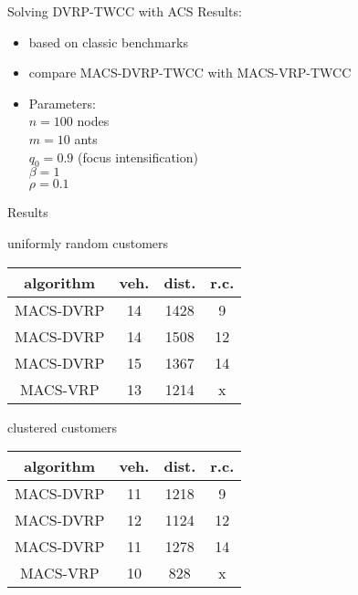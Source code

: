 \documentclass{beamer}
\begin{document}
\begin{frame}{Solving DVRP-TWCC with ACS}
  Results:
  \begin{itemize}
    \item based on classic benchmarks
    \item compare MACS-DVRP-TWCC with MACS-VRP-TWCC
    \item Parameters: \\
	  $n=100$ nodes\\
	  $m=10$ ants\\
	  $q_0=0.9$ (focus intensification)\\
	  $\beta = 1$\\
	  $\rho = 0.1$\\
    
  \end{itemize}
\end{frame}
\begin{frame}{Results}
  \begin{center}

  uniformly random customers\\
  \begin{tabular}{|c|c|c|c|}
    \hline
    algorithm	& veh.	& dist.	& r.c.	\\
    \hline
    MACS-DVRP	& 14	& 1428	& 9	\\
    MACS-DVRP	& 14	& 1508	& 12	\\
    MACS-DVRP	& 15	& 1367	& 14	\\
    \hline
    MACS-VRP	& 13	& 1214	& x	\\
    \hline
  \end{tabular}
  
  \vspace{15pt}

  clustered customers\\
  \begin{tabular}{|c|c|c|c|}
    \hline
    algorithm	& veh.	& dist.	& r.c.	\\
    \hline
    MACS-DVRP	& 11	& 1218	& 9	\\
    MACS-DVRP	& 12	& 1124	& 12	\\
    MACS-DVRP	& 11	& 1278	& 14	\\
    \hline
    MACS-VRP	& 10	& 828	& x	\\
    \hline
  \end{tabular}
  \end{center}

\end{frame}
\end{document}
